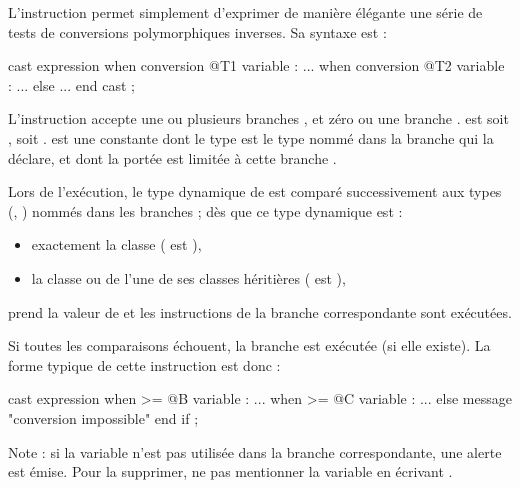 




L'instruction  permet simplement d'exprimer de manière élégante une série de tests de conversions polymorphiques inverses. Sa syntaxe est :

\begin{galgascode}
cast expression
when conversion @T1 variable :
  ...
when conversion @T2 variable :
  ...
else
  ...
end cast ;
\end{galgascode}

L'instruction accepte une ou plusieurs branches , et zéro ou une branche .  est soit \galgas{==}, soit \galgas{>=}.  est une constante dont le type est le type nommé dans la branche  qui la déclare, et dont la portée est limitée à cette branche .

Lors de l'exécution, le type dynamique de  est comparé successivement aux types (, ) nommés dans les branches  ; dès que ce type dynamique est :
\begin{itemize}
  \item exactement la classe  ( est \galgas{==}), 
  \item la classe  ou de l'une de ses classes héritières ( est \galgas{>=}),
\end{itemize}
 prend la valeur de  et les instructions de la branche correspondante sont exécutées.

Si toutes les comparaisons échouent, la branche  est exécutée (si elle existe). La forme typique de cette instruction est donc :


\begin{galgascode}
cast expression
when >= @B variable :
  ...
when >= @C variable :
  ...
else
  message "conversion impossible"
end if ;
\end{galgascode}

Note : si la variable  n'est pas utilisée dans la branche correspondante, une alerte est émise. Pour la supprimer, ne pas mentionner la variable en écrivant .



